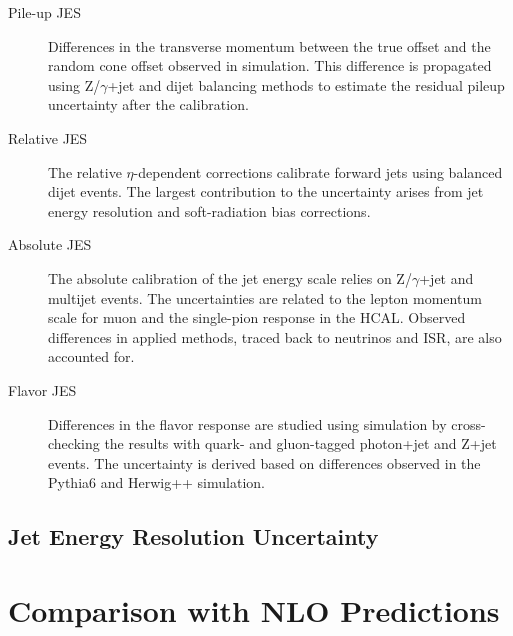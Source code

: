 \begin{description}
    \item[Pile-up JES] Differences in the transverse momentum between the true
        offset and the random cone offset observed in simulation. This
        difference is propagated using Z/$\gamma$+jet and dijet balancing
        methods to estimate the residual pileup uncertainty after the
        calibration.
    \item[Relative JES] The relative $\eta$-dependent corrections calibrate
        forward jets using balanced dijet events. The largest contribution to
        the uncertainty arises from jet energy resolution and soft-radiation
        bias corrections. 
    \item[Absolute JES]  The absolute calibration of the jet energy scale relies
        on Z/$\gamma$+jet and multijet events. The uncertainties are related to
        the lepton momentum scale for muon and the single-pion response in the
        HCAL. Observed differences in applied methods, traced back to neutrinos
        and ISR, are also accounted for. 
    \item[Flavor JES] Differences in the flavor response are studied using
        simulation by cross-checking the results with quark- and gluon-tagged
        photon+jet and Z+jet events. The uncertainty is derived based on
        differences observed in the Pythia6 and Herwig++ simulation.
\end{description}

\subsection{Jet Energy Resolution Uncertainty}

\section{Comparison with NLO Predictions}
\label{sec:nlo_comparisons}

